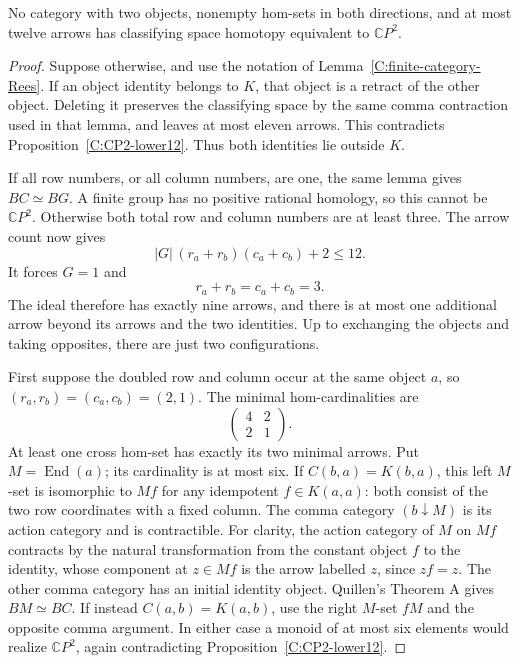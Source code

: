 \begin{proposition}
\label{C:twelve-strongly-connected}
No category with two objects, nonempty hom-sets in both
directions, and at most twelve arrows has classifying space
homotopy equivalent to $\mathbb CP^2$.
\end{proposition}
\begin{proof}
Suppose otherwise, and use the notation of
Lemma~\ref{C:finite-category-Rees}. If an object identity
belongs to $K$, that object is a retract of the other object.
Deleting it preserves the classifying space by the same comma
contraction used in that lemma, and leaves at most eleven
arrows. This contradicts Proposition~\ref{C:CP2-lower12}.
Thus both identities lie outside $K$.

If all row numbers, or all column numbers, are one, the same
lemma gives $BC\simeq BG$. A finite group has no positive
rational homology, so this cannot be $\mathbb CP^2$.
Otherwise both total row and column numbers are at least
three. The arrow count now gives
\[
 |G|\,(r_a+r_b)(c_a+c_b)+2\leq12.
\]
It forces $G=1$ and
\[
 r_a+r_b=c_a+c_b=3.
\]
The ideal therefore has exactly nine arrows, and there is at
most one additional arrow beyond its arrows and the two
identities. Up to exchanging the objects and taking opposites,
there are just two configurations.

First suppose the doubled row and column occur at the same
object $a$, so $(r_a,r_b)=(c_a,c_b)=(2,1)$.
The minimal hom-cardinalities are
\[
 \begin{pmatrix}4&2\\2&1\end{pmatrix}.
\]
At least one cross hom-set has exactly its two minimal arrows.
Put $M=\operatorname{End}(a)$; its cardinality is at most six.
If $C(b,a)=K(b,a)$, this left $M$-set is isomorphic to $Mf$
for any idempotent $f\in K(a,a)$: both consist of the two
row coordinates with a fixed column. The comma category
$(b\downarrow M)$ is its action category and is contractible.
For clarity, the action category of $M$ on $Mf$ contracts
by the natural transformation from the constant object $f$
to the identity, whose component at $z\in Mf$ is the arrow
labelled $z$, since $zf=z$.
The other comma category has an initial identity object.
Quillen's Theorem A gives $BM\simeq BC$.
If instead $C(a,b)=K(a,b)$, use the right $M$-set $fM$ and
the opposite comma argument. In either case a monoid of at
most six elements would realize $\mathbb CP^2$, again
contradicting Proposition~\ref{C:CP2-lower12}.


\end{proof}
